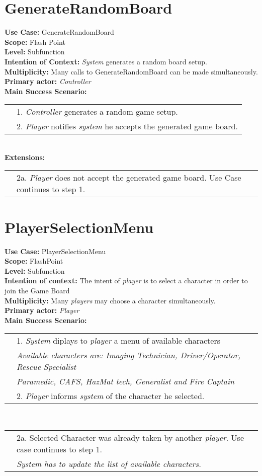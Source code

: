 \documentclass{article}
\begin{document}
	\section*{GenerateRandomBoard}
	\textbf{Use Case:} GenerateRandomBoard\\
	\textbf{Scope:} Flash Point\\
	\textbf{Level:} Subfunction\\
	\textbf{Intention of Context:} \textit{System} generates a random board setup.\\
	\textbf{Multiplicity:} Many calls to GenerateRandomBoard can be made simultaneously.\\
	\textbf{Primary actor:} \textit{Controller}\\
	\textbf{Main Success Scenario:}\\
	\begin{tabular}{l l}
		&1. \textit{Controller} generates a random game setup.\\
		&2. \textit{Player} notifies \textit{system} he accepts the generated game board.
	\end{tabular}\\
	\textbf{Extensions:}\\
	\begin{tabular}{l l}
		&2a. \textit{Player} does not accept the generated game board. Use Case continues to step 1. 
	\end{tabular}
	\section*{PlayerSelectionMenu}
	\textbf{Use Case:} PlayerSelectionMenu\\
	\textbf{Scope:} FlashPoint\\
	\textbf{Level:}  Subfunction\\
	\textbf{Intention of context:} The intent of \textit{player} is to select a character in order to join the Game Board\\
	\textbf{Multiplicity:} Many \textit{players} may choose a character simultaneously.\\
	\textbf{Primary actor:} \textit{Player}\\
	\textbf{Main Success Scenario:}\\
	\begin{tabular}{l l}
		&1. \textit{System} diplays to \textit{player} a menu of available characters\\
		&\qquad\textit{Available characters are: Imaging Technician, Driver/Operator, Rescue Specialist}\\
		&\qquad\qquad\textit{Paramedic, CAFS, HazMat tech, Generalist and Fire Captain }\\
		&2. \textit{Player} informs \textit{system} of the character he selected.
	\end{tabular}\\
	\begin{tabular}{l l}
		&2a. Selected Character was already taken by another \textit{player}. Use case continues to step 1.\\
		&\qquad\textit{System has to update the list of available characters.}
	\end{tabular}
\end{document}
